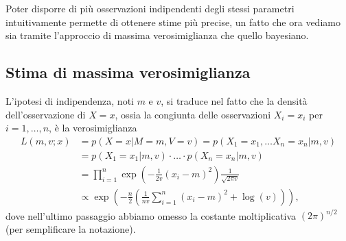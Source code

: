 \documentclass[
  italian,
  letterpaper,
]{book}
\newcommand{\bra}[1]{\left( #1 \right)}
\theoremstyle{definition}
\theoremstyle{remark}
\begin{document}
Poter disporre di più osservazioni indipendenti degli stessi parametri
intuitivamente permette di ottenere stime più precise, un fatto che ora
vediamo sia tramite l'approccio di massima verosimiglianza che quello
bayesiano.

\subsection{Stima di massima
verosimiglianza}\label{stima-di-massima-verosimiglianza-1}

L'ipotesi di indipendenza, noti \(m\) e \(v\), si traduce nel fatto che
la densità dell'osservazione di \(X=x\), ossia la congiunta delle
osservazioni \(X_i=x_i\) per \(i=1,\ldots, n\), è la verosimiglianza
\[ \begin{split} L(m, v; x)& = p(X=x|M=m,V=v)  = p(X_1 = x_1, \ldots X_n = x_n | m, v) \\
& =  p(X_1 = x_1 | m,v) \cdot \ldots \cdot p(X_n = x_n | m, v) \\
& = \prod_{i=1}^n \exp\bra{ -\frac{1}{2v} (x_i -m)^2 } \frac{1}{\sqrt{ 2 \pi v}} \\
& \propto \exp\bra{ - \frac {n}{2} \bra{ \frac 1 {nv} \sum_{i=1}^n (x_i - m)^2 +  \log( v )}},\end{split}\]
dove nell'ultimo passaggio abbiamo omesso la costante moltiplicativa
\((2 \pi)^{n/2}\) (per semplificare la notazione).
\end{document}
